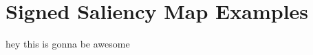 \documentclass[preprint,12pt]{elsarticle}
\begin{document}
\appendix

\section{Signed Saliency Map Examples}
\label{sec:signed saliency map examples}
hey this is gonna be awesome







\end{document}
